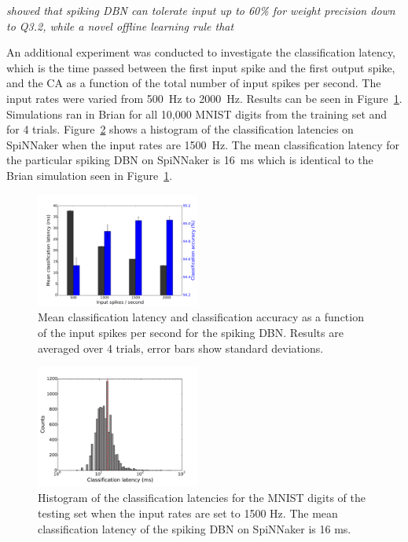 
\citet{} \textit{showed that spiking DBN can tolerate input 
up to 60\% for weight precision down to Q3.2, while a novel offline learning rule that }


An additional experiment was conducted to investigate the classification latency, which is the time passed between the first input spike and the first output spike, and the CA as a function of the total number of input spikes per second. The input rates were varied from 500~Hz to 2000~Hz. Results can be seen in Figure~\ref{Fig:brianLatency}. Simulations ran in Brian for all 10,000 MNIST digits from the training set and for 4 trials. Figure~\ref{Fig:spinnLatency1500hz} shows a histogram of the classification latencies on SpiNNaker when the input rates are 1500~Hz. The mean classification latency for the particular spiking DBN on SpiNNaker is 16~ms which is identical to the Brian simulation seen in Figure~\ref{Fig:brianLatency}.


\begin{figure}[hbt!]
	\centering
	\includegraphics[width=0.48\textwidth]{images/evan/latencyCAfiringrate.pdf}
	\caption{Mean classification latency and classification accuracy as a function of the input spikes per second for the spiking DBN. Results are averaged over 4 trials, error bars show standard deviations.}
	\label{Fig:brianLatency}
\end{figure} 



\begin{figure}[hbt!]
	\centering
	\includegraphics[width=0.48\textwidth]{images/evan/classlatencyIJCNN1500hz.pdf}
	\caption{Histogram of the classification latencies for the MNIST digits of the testing set when the input rates are set to 1500 Hz. The mean classification latency of the spiking DBN on SpiNNaker is 16 ms.}
	\label{Fig:spinnLatency1500hz}
\end{figure} 

